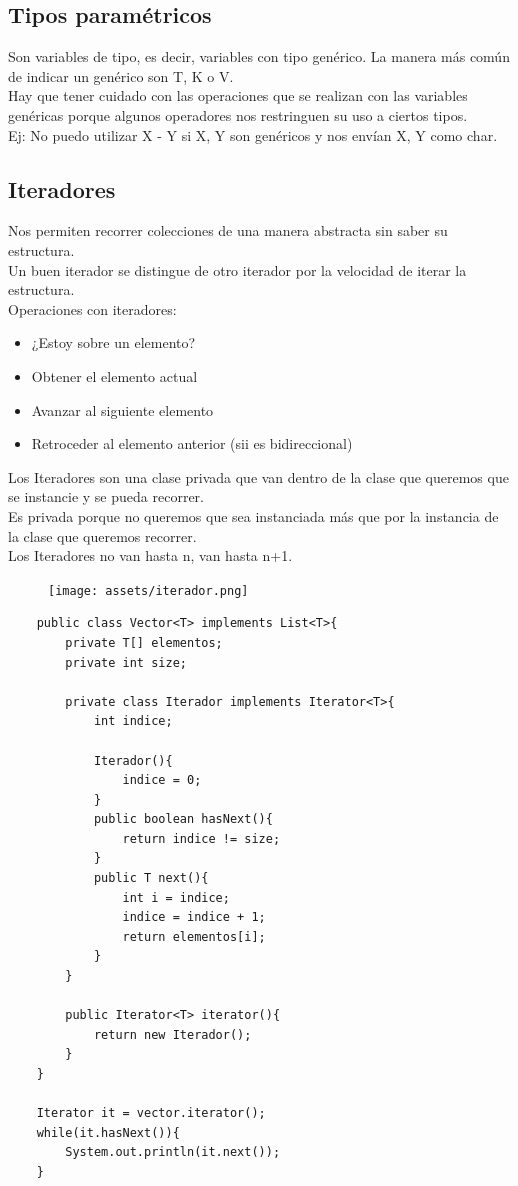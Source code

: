 \documentclass[10pt,a4paper]{article}
\begin{document}
\subsection*{Tipos paramétricos}
Son variables de tipo, es decir, variables con tipo genérico.
La manera más común de indicar un genérico son T, K o V.  \\
Hay que tener cuidado con las operaciones que se realizan con las variables genéricas porque algunos operadores nos restringuen su uso a ciertos tipos. \\
Ej: No puedo utilizar X - Y si X, Y son genéricos y nos envían X, Y como char.
\subsection*{Iteradores}
Nos permiten recorrer colecciones de una manera abstracta sin saber su estructura. \\
Un buen iterador se distingue de otro iterador por la velocidad de iterar la estructura. \\
Operaciones con iteradores:
\begin{itemize}
    \item ¿Estoy sobre un elemento? 
    \item Obtener el elemento actual
    \item Avanzar al siguiente elemento
    \item Retroceder al elemento anterior (sii es bidireccional)
\end{itemize}
Los Iteradores son una clase privada que van dentro de la clase que queremos que se instancie y se pueda recorrer. \\
Es privada porque no queremos que sea instanciada más que por la instancia de la clase que queremos recorrer. \\
Los Iteradores no van hasta n, van hasta n+1.
\begin{figure}[h]
    \texttt{[image: assets/iterador.png]}
\end{figure}
\begin{lstlisting}
    public class Vector<T> implements List<T>{
        private T[] elementos;
        private int size;
        
        private class Iterador implements Iterator<T>{
            int indice;
            
            Iterador(){
                indice = 0;
            }
            public boolean hasNext(){
                return indice != size;
            }
            public T next(){
                int i = indice;
                indice = indice + 1;
                return elementos[i];
            }
        }

        public Iterator<T> iterator(){
            return new Iterador();
        }
    }

    Iterator it = vector.iterator();
    while(it.hasNext()){
        System.out.println(it.next());
    }
\end{lstlisting}
\end{document}
